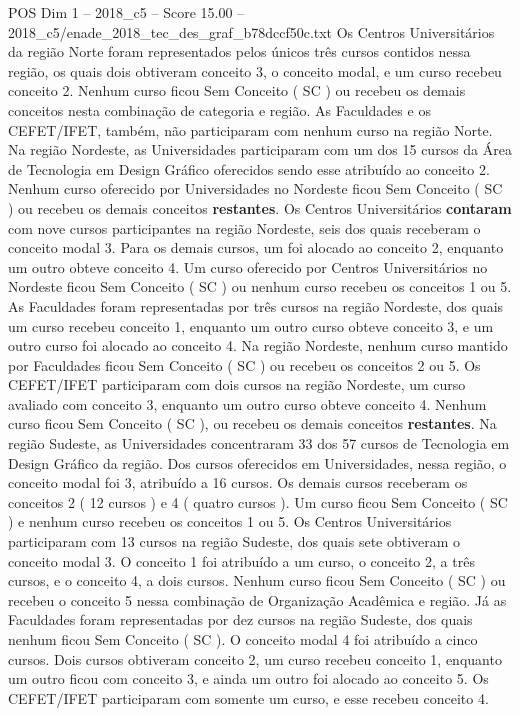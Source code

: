 \begin{textsample}{POS Dim 1 – 2018\_c5 – Score 15.00 – 2018\_c5/enade\_2018\_tec\_des\_graf\_b78dccf50c.txt}
Os Centros Universitários da região Norte foram representados pelos únicos três cursos contidos nessa região, os quais dois obtiveram conceito 3, o conceito modal, e um curso recebeu conceito 2.
Nenhum curso ficou Sem Conceito ( SC ) ou recebeu os demais conceitos nesta combinação de categoria e região.
As Faculdades e os CEFET/IFET, também, não participaram com nenhum curso na região Norte.
Na região Nordeste, as Universidades participaram com um dos 15 cursos da Área de Tecnologia em Design Gráfico oferecidos sendo esse atribuído ao conceito 2.
Nenhum curso oferecido por Universidades no Nordeste ficou Sem Conceito ( SC ) ou recebeu os demais conceitos \textbf{restantes}.
Os Centros Universitários \textbf{contaram} com nove cursos participantes na região Nordeste, seis dos quais receberam o conceito modal 3.
Para os demais cursos, um foi alocado ao conceito 2, enquanto um outro obteve conceito 4.
Um curso oferecido por Centros Universitários no Nordeste ficou Sem Conceito ( SC ) ou nenhum curso recebeu os conceitos 1 ou 5.
As Faculdades foram representadas por três cursos na região Nordeste, dos quais um curso recebeu conceito 1, enquanto um outro curso obteve conceito 3, e um outro curso foi alocado ao conceito 4.
Na região Nordeste, nenhum curso mantido por Faculdades ficou Sem Conceito ( SC ) ou recebeu os conceitos 2 ou 5.
Os CEFET/IFET participaram com dois cursos na região Nordeste, um curso avaliado com conceito 3, enquanto um outro curso obteve conceito 4.
Nenhum curso ficou Sem Conceito ( SC ), ou recebeu os demais conceitos \textbf{restantes}.
Na região Sudeste, as Universidades concentraram 33 dos 57 cursos de Tecnologia em Design Gráfico da região.
Dos cursos oferecidos em Universidades, nessa região, o conceito modal foi 3, atribuído a 16 cursos.
Os demais cursos receberam os conceitos 2 ( 12 cursos ) e 4 ( quatro cursos ).
Um curso ficou Sem Conceito ( SC ) e nenhum curso recebeu os conceitos 1 ou 5.
Os Centros Universitários participaram com 13 cursos na região Sudeste, dos quais sete obtiveram o conceito modal 3.
O conceito 1 foi atribuído a um curso, o conceito 2, a três cursos, e o conceito 4, a dois cursos.
Nenhum curso ficou Sem Conceito ( SC ) ou recebeu o conceito 5 nessa combinação de Organização Acadêmica e região.
Já as Faculdades foram representadas por dez cursos na região Sudeste, dos quais nenhum ficou Sem Conceito ( SC ).
O conceito modal 4 foi atribuído a cinco cursos.
Dois cursos obtiveram conceito 2, um curso recebeu conceito 1, enquanto um outro ficou com conceito 3, e ainda um outro foi alocado ao conceito 5.
Os CEFET/IFET participaram com somente um curso, e esse recebeu conceito 4.

\end{textsample}
